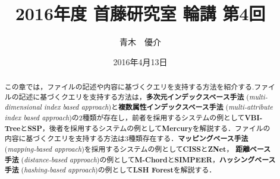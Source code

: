 \documentclass{jarticle}
\title{2016年度 首藤研究室 輪講 第4回}
\author{青木　優介}
\date{2016年4月13日}
\begin{document}
\renewcommand{\baselinestretch}{1.5} %

\maketitle

\begin{abstract}
\begin{small}
この章では，ファイルの記述や内容に基づくクエリを支持する方法を紹介する.ファイルの記述に基づくクエリを支持する方法は，\textbf{多次元インデックスベース手法} (\textit{multi-dimensional index based approach})と\textbf{複数属性インデックスベース手法} (\textit{multi-attribute index based approach})の2種類が存在し，前者を採用するシステムの例として\textbf{VBI-Tree}と\textbf{SSP}，後者を採用するシステムの例として\textbf{Mercury}を解説する．ファイルの内容に基づくクエリを支持する方法は3種類存在する．\textbf{マッピングベース手法} (\textit{mapping-based approach})を採用するシステムの例として\textbf{CISS}と\textbf{ZNet}，
\textbf{距離ベース手法} (\textit{distance-based approach})の例として\textbf{M-Chord}と\textbf{SIMPEER}，\textbf{ハッシングベース手法} (\textit{hashing-based approach})の例として\textbf{LSH Forest}を解説する．
\end{small}
\end{abstract}
\end{document}
